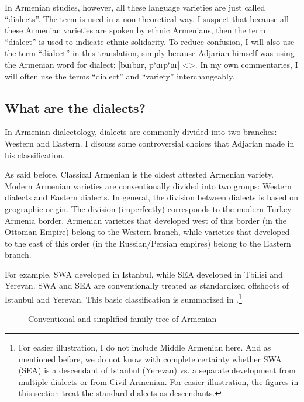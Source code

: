 \documentclass[output=paper]{langscibook}
\begin{document}
In Armenian studies, however, all these language varieties are just called ``dialects''.  The term is used in a non-theoretical way. I suspect that because all these Armenian varieties are spoken by ethnic Armenians, then the term ``dialect'' is used to indicate ethnic solidarity. To reduce confusion, I will also use the term ``dialect'' in this translation, simply because Adjarian himself was using the Armenian word for dialect: [bɑɾbɑr, pʰɑɾpʰɑɾ] <>. In my own commentaries, I will often use the terms ``dialect'' and ``variety'' interchangeably.


\subsection{What are the dialects?}\label{sec:HossepIntro:armenian:whataredialect}

In Armenian dialectology, dialects are commonly divided into two branches: Western and Eastern. I discuss some controversial choices that Adjarian made in his classification. 


As said before, Classical Armenian is the oldest attested Armenian variety. Modern Armenian varieties are conventionally divided into two groups: Western dialects and Eastern dialects. In general, the division between dialects is based on geographic origin. The division (imperfectly) corresponds to the modern Turkey-Armenia border. Armenian varieties that developed west of this border (in the Ottoman Empire) belong to the Western branch, while varieties that developed to the east of this order (in the Russian/Persian empires) belong to the Eastern branch. 

For example, SWA developed in Istanbul, while SEA developed in Tbilisi and Yerevan. SWA and SEA are conventionally treated as standardized offshoots of Istanbul and Yerevan. This basic classification is summarized in .\footnote{For easier illustration, I do not include Middle Armenian here. And as mentioned before, we do not know with complete certainty whether SWA (SEA) is a descendant of Istanbul (Yerevan) vs. a separate development from multiple dialects or from Civil Armenian. For easier illustration, the figures in this section treat the standard dialects as descendants.}

\begin{figure}
\caption{Conventional and simplified family tree of Armenian}
\label{tree:dialect:basic}
\end{figure}
\end{document}
